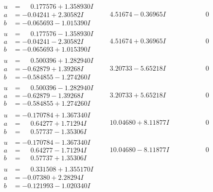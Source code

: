 \documentclass[1p]{elsarticle_modified}
\theoremstyle{definition}
\begin{document}
$$\begin{array}{c|c|c}
\begin{aligned}
u &= \phantom{-}0.177576 + 1.358930 I \\
a &= -0.04241 + 2.30582 I \\
b &= -0.065693 - 1.015390 I\end{aligned}
 & \phantom{-}4.51674 - 0.36965 I & \phantom{-0.000000 } 0 \\ \hline\begin{aligned}
u &= \phantom{-}0.177576 - 1.358930 I \\
a &= -0.04241 - 2.30582 I \\
b &= -0.065693 + 1.015390 I\end{aligned}
 & \phantom{-}4.51674 + 0.36965 I & \phantom{-0.000000 } 0 \\ \hline\begin{aligned}
u &= \phantom{-}0.500396 + 1.282940 I \\
a &= -0.62879 + 1.39268 I \\
b &= -0.584855 - 1.274260 I\end{aligned}
 & \phantom{-}3.20733 - 5.65218 I & \phantom{-0.000000 } 0 \\ \hline\begin{aligned}
u &= \phantom{-}0.500396 - 1.282940 I \\
a &= -0.62879 - 1.39268 I \\
b &= -0.584855 + 1.274260 I\end{aligned}
 & \phantom{-}3.20733 + 5.65218 I & \phantom{-0.000000 } 0 \\ \hline\begin{aligned}
u &= -0.170784 + 1.367340 I \\
a &= \phantom{-}0.64277 + 1.71294 I \\
b &= \phantom{-}0.57737 - 1.35306 I\end{aligned}
 & \phantom{-}10.04680 + 8.11877 I & \phantom{-0.000000 } 0 \\ \hline\begin{aligned}
u &= -0.170784 - 1.367340 I \\
a &= \phantom{-}0.64277 - 1.71294 I \\
b &= \phantom{-}0.57737 + 1.35306 I\end{aligned}
 & \phantom{-}10.04680 - 8.11877 I & \phantom{-0.000000 } 0 \\ \hline\begin{aligned}
u &= \phantom{-}0.331508 + 1.355170 I \\
a &= -0.07380 + 2.28294 I \\
b &= -0.121993 - 1.020340 I\end{aligned}

\end{array}$$
\end{document}
